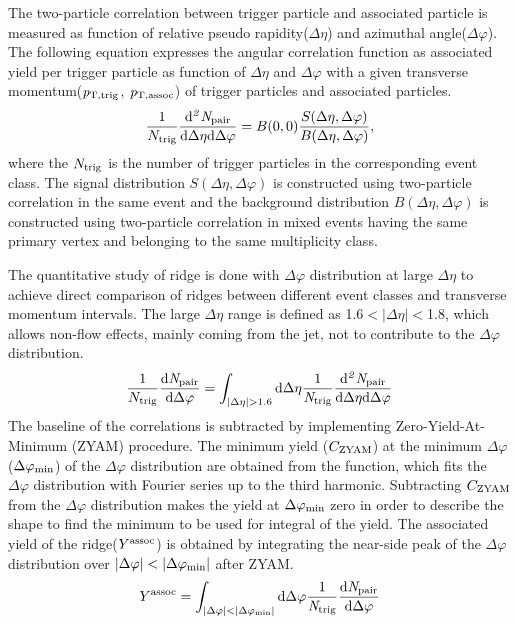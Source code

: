 The two-particle correlation between trigger particle and associated particle is measured as function of relative pseudo rapidity($\Delta\eta$) and azimuthal angle($\Delta\varphi$). The following equation expresses the angular correlation function as associated yield per trigger particle as function of $\Delta\eta$ and $\Delta\varphi$ with a given transverse momentum($\it{p}_{\rm{T, trig}}$, $\it{p}_{\rm{T, assoc}}$) of trigger particles and associated particles.
\begin{eqnarray}
\frac{1}{N_{\rm{trig}}} \frac{ \rm{d}\it{}^{2} N_{\rm{pair}} }{ \rm{d} \Delta\eta \rm{d}\Delta\varphi} = B(0, 0)\frac{S(\Delta\eta, \Delta\varphi)}{B(\Delta\eta, \Delta\varphi)},
\end{eqnarray}
where the $N_{\rm{trig}}$ is the number of trigger particles in the corresponding event class. The signal distribution $S(\Delta\eta, \Delta\varphi)$ is constructed using two-particle correlation in the same event and the background distribution $B(\Delta\eta, \Delta\varphi)$ is constructed using two-particle correlation in mixed events having the same primary vertex and belonging to the same multiplicity class.

The quantitative study of ridge is done with $\Delta\varphi$ distribution at large $\Delta\eta$ to achieve direct comparison of ridges between different event classes and transverse momentum intervals. The large $\Delta\eta$ range is defined as 1.6$<|\Delta\eta|<$1.8, which allows non-flow effects, mainly coming from the jet, not to contribute to the $\Delta\varphi$ distribution.
\begin{eqnarray}
\frac{1}{N_{\rm{trig}}} \frac{ \rm{d}\it{}N_{\rm{pair}} }{ \rm{d}\Delta\varphi } = \int_{|\Delta \eta|>1.6} \rm{d} \Delta \eta \frac{1}{\it{N}_{\rm{trig}}} \frac{ \rm{d}\it{}^{2} N_{\rm{pair}} }{ \rm{d}\Delta\eta \rm{d}\Delta\varphi}
\end{eqnarray}
The baseline of the correlations is subtracted by implementing Zero-Yield-At-Minimum (ZYAM) procedure. The minimum yield ($C_{\rm{ZYAM}}$) at the minimum $\Delta\varphi$($\Delta\varphi_{\rm{min}}$) of the $\Delta\varphi$ distribution are obtained from the function, which fits the $\Delta\varphi$ distribution with Fourier series up to the third harmonic. Subtracting $C_{\rm{ZYAM}}$ from the $\Delta\varphi$ distribution makes the yield at $\Delta\varphi_{\rm{min}}$ zero in order to describe the shape to find the minimum to be used for integral of the yield. The associated yield of the ridge($Y^{\rm{assoc}}$) is obtained by integrating the near-side peak of the $\Delta\varphi$ distribution over $|\Delta\varphi|<|\Delta\varphi_{\rm{min}}|$ after ZYAM.
\begin{eqnarray}
Y^{\rm{assoc}} = \int_{|\Delta \varphi| < |\Delta\varphi_{\rm{min}}| } \rm{d} \Delta\varphi \frac{1}{\it{N}_{\rm{trig}}} \frac{ \rm{d}\it{}N_{\rm{pair}} }{ \rm{d}\Delta\varphi } 
\end{eqnarray}

